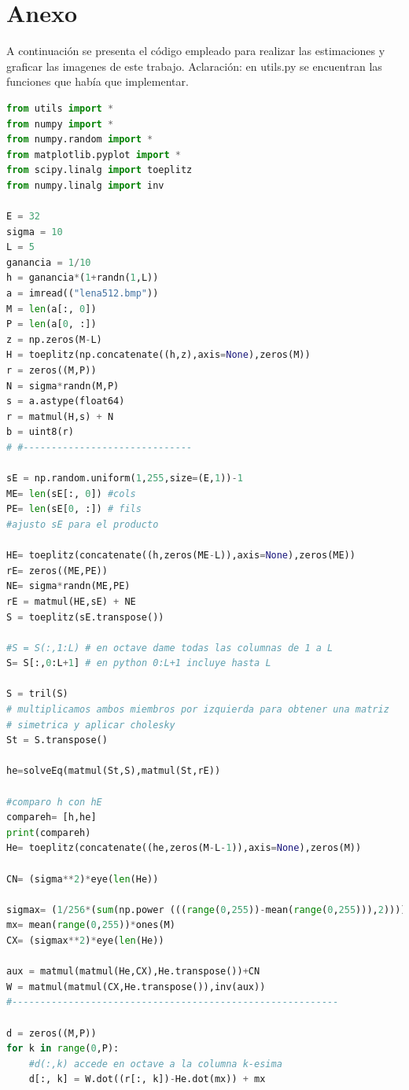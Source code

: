 \section{Anexo}
A continuaci\'on se presenta el c\'odigo empleado para realizar las estimaciones y graficar las imagenes de este trabajo. 
Aclaraci\'on: en utils.py se encuentran las funciones que hab\'ia que implementar.


\begin{lstlisting}[language=Python, caption=Ej1.py]
from utils import *
from numpy import *
from numpy.random import *
from matplotlib.pyplot import *
from scipy.linalg import toeplitz
from numpy.linalg import inv

E = 32
sigma = 10
L = 5
ganancia = 1/10
h = ganancia*(1+randn(1,L))
a = imread(("lena512.bmp"))
M = len(a[:, 0])
P = len(a[0, :])
z = np.zeros(M-L)
H = toeplitz(np.concatenate((h,z),axis=None),zeros(M))
r = zeros((M,P))
N = sigma*randn(M,P)
s = a.astype(float64)
r = matmul(H,s) + N
b = uint8(r)
# #------------------------------

sE = np.random.uniform(1,255,size=(E,1))-1
ME= len(sE[:, 0]) #cols
PE= len(sE[0, :]) # fils
#ajusto sE para el producto

HE= toeplitz(concatenate((h,zeros(ME-L)),axis=None),zeros(ME))
rE= zeros((ME,PE))
NE= sigma*randn(ME,PE)
rE = matmul(HE,sE) + NE
S = toeplitz(sE.transpose())

#S = S(:,1:L) # en octave dame todas las columnas de 1 a L
S= S[:,0:L+1] # en python 0:L+1 incluye hasta L

S = tril(S)
# multiplicamos ambos miembros por izquierda para obtener una matriz
# simetrica y aplicar cholesky
St = S.transpose()

he=solveEq(matmul(St,S),matmul(St,rE))

#comparo h con hE
compareh= [h,he]
print(compareh)
He= toeplitz(concatenate((he,zeros(M-L-1)),axis=None),zeros(M))

CN= (sigma**2)*eye(len(He))

sigmax= (1/256*(sum(np.power (((range(0,255))-mean(range(0,255))),2))))**(1/2)
mx= mean(range(0,255))*ones(M)
CX= (sigmax**2)*eye(len(He))

aux = matmul(matmul(He,CX),He.transpose())+CN
W = matmul(matmul(CX,He.transpose()),inv(aux))
#----------------------------------------------------------

d = zeros((M,P))
for k in range(0,P):
    #d(:,k) accede en octave a la columna k-esima
    d[:, k] = W.dot((r[:, k])-He.dot(mx)) + mx


\end{lstlisting}
